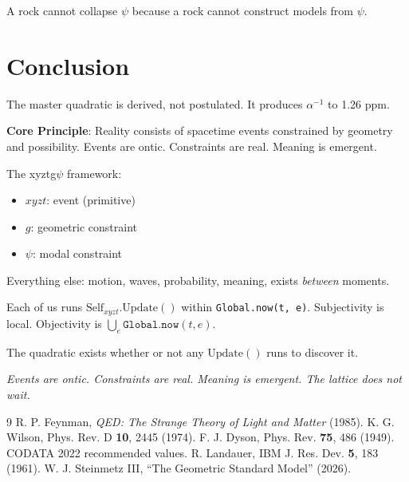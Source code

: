 \documentclass[aps,prl,twocolumn,showpacs,superscriptaddress,groupedaddress]{revtex4-2}
\begin{document}
A rock cannot collapse $\psi$ because a rock cannot construct models from $\psi$.

\section{Conclusion}

The master quadratic is derived, not postulated. It produces $\alpha^{-1}$ to 1.26 ppm.

\textbf{Core Principle}: Reality consists of spacetime events constrained by geometry and possibility. Events are ontic. Constraints are real. Meaning is emergent.

The xyztg$\psi$ framework:
\begin{itemize}
\item $xyzt$: event (primitive)
\item $g$: geometric constraint
\item $\psi$: modal constraint
\end{itemize}

Everything else: motion, waves, probability, meaning, exists \textit{between} moments.

Each of us runs $\text{Self}_{xyzt}.\text{Update}()$ within \texttt{Global.now(t, e)}. Subjectivity is local. Objectivity is $\bigcup_e \texttt{Global.now}(t, e)$.

The quadratic exists whether or not any $\text{Update}()$ runs to discover it.

\textit{Events are ontic. Constraints are real. Meaning is emergent. The lattice does not wait.}

\begin{thebibliography}{9}
 R. P. Feynman, \textit{QED: The Strange Theory of Light and Matter} (1985).
 K. G. Wilson, Phys. Rev. D \textbf{10}, 2445 (1974).
 F. J. Dyson, Phys. Rev. \textbf{75}, 486 (1949).
 CODATA 2022 recommended values.
 R. Landauer, IBM J. Res. Dev. \textbf{5}, 183 (1961).
 W. J. Steinmetz III, ``The Geometric Standard Model'' (2026).
\end{thebibliography}
\end{document}
